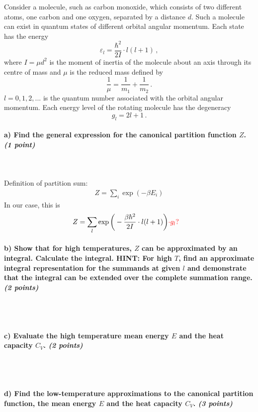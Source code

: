 Consider a molecule, such as carbon monoxide, which consists of two 
different atoms, one carbon and one oxygen, separated by a distance $d$. 
Such a molecule can exist in quantum states of different orbital angular 
momentum. Each state has the energy
\begin{equation}
    \varepsilon_l=\frac{\hbar^2}{2I}\cdot l(l+1) \,,
\end{equation}
where $I=\mu d^2$ is the moment of inertia of the molecule about an axis 
through its centre of mass and $\mu$ is the reduced mass defined by 
\begin{equation}
    \frac{1}{\mu}=\frac{1}{m_1}+\frac{1}{m_2} \,.
\end{equation}
$l=0,1,2,...$ is the quantum number associated with the orbital angular 
momentum. Each energy level of the rotating molecule has the degeneracy
\begin{equation}
    g_l=2l+1 \,.
\end{equation}

\paragraph{a) Find the general expression for the canonical partition 
    function $Z$. \textit{(1 point)}
} \ \\
\\
    Definition of partition sum:
    \begin{align}
        Z=\sum_i\exp(-\beta E_i)
    \end{align}
    In our case, this is
    \begin{align}
        Z
        &=\sum_l\exp\bigg(-\frac{\beta\hbar^2}{2I}\cdot l(l+1)\bigg)
        \textcolor{red}{\cdot g_l ?}
    \end{align}

\paragraph{b) Show that for high temperatures, $Z$ can be approximated 
    by an integral. Calculate the integral. HINT: For high $T$, find an 
    approximate integral representation for the summands at given $l$ and
    demonstrate that the integral can be extended over the complete 
    summation range. \textit{(2 points)}
} \ \\
\\

\paragraph{c) Evaluate the high temperature mean energy $E$ and the heat 
    capacity $C_V$. \textit{(2 points)}
} \ \\
\\

\paragraph{d) Find the low-temperature approximations to the canonical 
    partition function, the mean energy $E$ and the heat capacity $C_V$.
    \textit{(3 points)}
} \ \\
\\
